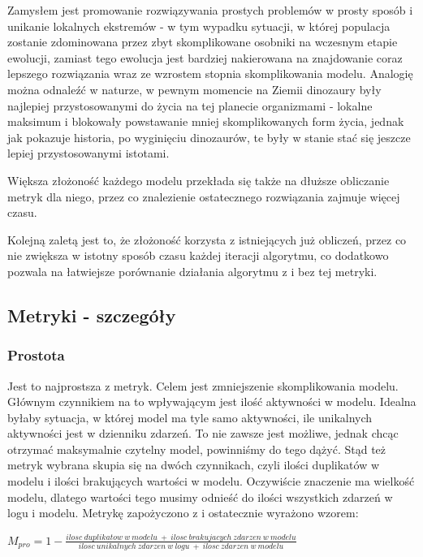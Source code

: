 Zamysłem jest promowanie rozwiązywania prostych problemów w prosty sposób i unikanie lokalnych ekstremów - w tym wypadku sytuacji, w której populacja zostanie zdominowana przez zbyt skomplikowane osobniki na wczesnym etapie ewolucji, zamiast tego ewolucja jest bardziej nakierowana na znajdowanie coraz lepszego rozwiązania wraz ze wzrostem stopnia skomplikowania modelu. Analogię można odnaleźć w naturze, w pewnym momencie na Ziemii dinozaury były najlepiej przystosowanymi do życia na tej planecie organizmami - lokalne maksimum i blokowały powstawanie mniej skomplikowanych form życia, jednak jak pokazuje historia, po wyginięciu dinozaurów, te były w stanie stać się jeszcze lepiej przystosowanymi istotami.

Większa złożoność każdego modelu przekłada się także na dłuższe obliczanie metryk dla niego, przez co znalezienie ostatecznego rozwiązania zajmuje więcej czasu.

Kolejną zaletą jest to, że złożoność korzysta z istniejących już obliczeń, przez co nie zwiększa w istotny sposób czasu każdej iteracji algorytmu, co dodatkowo pozwala na łatwiejsze porównanie działania algorytmu z i bez tej metryki.

\subsection{Metryki - szczegóły}

\subsubsection{Prostota}  
Jest to najprostsza z metryk. Celem jest zmniejszenie skomplikowania modelu. Głównym czynnikiem na to wpływającym jest ilość aktywności w modelu. Idealna byłaby sytuacja, w której model ma tyle samo aktywności, ile unikalnych aktywności jest w dzienniku zdarzeń. To nie zawsze jest możliwe, jednak chcąc otrzymać maksymalnie czytelny model, powinniśmy do tego dążyć. Stąd też metryk wybrana skupia się na dwóch czynnikach, czyli ilości duplikatów w modelu i ilości brakujących wartości w modelu. Oczywiście znaczenie ma wielkość modelu, dlatego wartości tego musimy odnieść do ilości wszystkich zdarzeń w logu i modelu. Metrykę zapożyczono z \cite{qd-in-discovery} i ostatecznie wyrażono wzorem: \begin{center}
$M_{pro} = 1 - \frac{ilosc\ duplikatow\ w\ modelu\ +\ ilosc\ brakujacych\ zdarzen\ w\ modelu}{ilosc\ unikalnych\ zdarzen\ w\ logu\ +\ ilosc\ zdarzen\ w\ modelu}$
\end{center}
